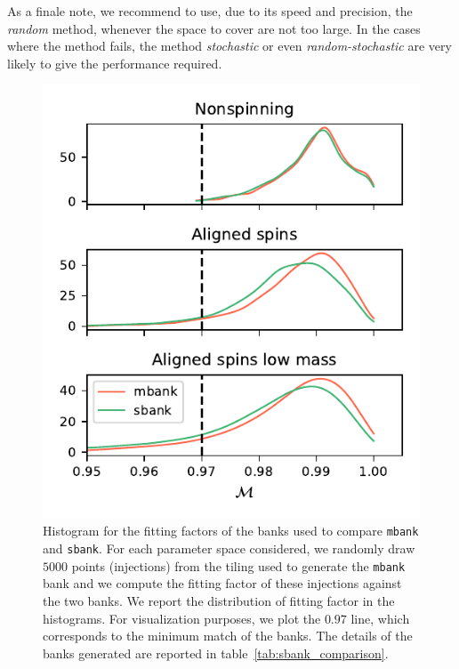 \documentclass[twocolumn,showpacs,preprintnumbers,nofootinbib,prd,
superscriptaddress,10pt]{revtex4-2}
\begin{document}
As a finale note, we recommend to use, due to its speed and precision, the {\it random} method, whenever the space to cover are not too large. In the cases where the method fails, the method {\it stochastic} or even {\it random-stochastic} are very likely to give the performance required.

\begin{figure}[t!]
	\includegraphics{sbank_comparison}
	\caption{Histogram for the fitting factors of the banks used to compare \texttt{mbank} and \texttt{sbank}. For each parameter space considered, we randomly draw $5000$ points (injections) from the tiling used to generate the \texttt{mbank} bank and we compute the fitting factor of these injections against the two banks. We report the distribution of fitting factor in the histograms. For visualization purposes, we plot the $0.97$ line, which corresponds to the minimum match of the banks.
	The details of the banks generated are reported in table~\ref{tab:sbank_comparison}.
	}
	\label{fig:sbank_comparison}
\end{figure}
\end{document}
